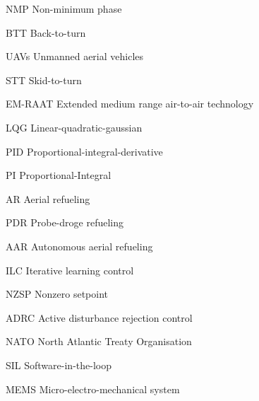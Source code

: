 \bigskip

NMP  \quad Non-minimum phase 

\bigskip

BTT  \quad Back-to-turn 

\bigskip

UAVs  \quad Unmanned aerial vehicles 

\bigskip

STT  \quad Skid-to-turn 

\bigskip

EM-RAAT  \quad Extended medium range air-to-air technology

\bigskip

LQG  \quad Linear-quadratic-gaussian

\bigskip

PID  \quad Proportional-integral-derivative

\bigskip

PI  \quad Proportional-Integral

\bigskip

AR  \quad Aerial refueling

\bigskip

PDR  \quad Probe-droge refueling

\bigskip

AAR  \quad Autonomous aerial refueling

\bigskip

ILC  \quad Iterative learning control

\bigskip

NZSP  \quad Nonzero setpoint

\bigskip

ADRC  \quad Active disturbance rejection control

\bigskip

NATO  \quad North Atlantic Treaty Organisation

\bigskip

SIL  \quad Software-in-the-loop

\bigskip

MEMS  \quad Micro-electro-mechanical system

\bigskip